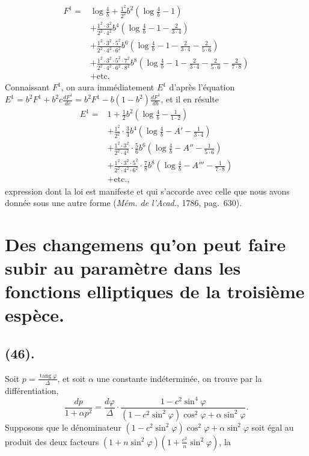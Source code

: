 \documentclass{article}
\begin{document}
\[ \begin{aligned} F^{1}={}&\log\frac{4}{b}+\frac{1^{2}}{2^{2}}b^{2}\left(\log\frac{4}{b}-1\right)\\ &+\frac{1^{2}\cdot 3^{2}}{2^{2}\cdot 4^{2}}b^{4}\left(\log\frac{4}{b}-1-\frac{2}{3\cdot 4}\right)\\ &+\frac{1^{2}\cdot 3^{2}\cdot 5^{2}}{2^{2}\cdot 4^{2}\cdot 6^{2}}b^{6}\left(\log\frac{4}{b}-1-\frac{2}{3\cdot 4}-\frac{2}{5\cdot 6}\right)\\ &+\frac{1^{2}\cdot 3^{2}\cdot 5^{2}\cdot 7^{2}}{2^{2}\cdot 4^{2}\cdot 6^{2}\cdot 8^{2}}b^{8}\left(\log\frac{4}{b}-1-\frac{2}{3\cdot 4}-\frac{2}{5\cdot 6}-\frac{2}{7\cdot 8}\right)\\ &+\text{etc.} \end{aligned} \]
Connaissant $F^{1}$, on aura immédiatement $E^{1}$ d'après l'équation $E^{1}=b^{2}F^{1}+b^{2}c\frac{dF^{1}}{dc}=b^{2}F^{1}-b(1-b^{2})\frac{dF^{1}}{db}$, et il en résulte
\[ \begin{aligned} E^{1}={}&1+\frac{1}{2}b^{2}\left(\log\frac{4}{b}-\frac{1}{1\cdot 2}\right)\\ &+\frac{1^{2}}{2^{2}}\cdot\frac{3}{4}b^{4}\left(\log\frac{4}{b}-A'-\frac{1}{3\cdot 4}\right)\\ &+\frac{1^{2}\cdot 3^{2}}{2^{2}\cdot 4^{2}}\cdot\frac{5}{6}b^{6}\left(\log\frac{4}{b}-A''-\frac{1}{5\cdot 6}\right)\\ &+\frac{1^{2}\cdot 3^{2}\cdot 5^{2}}{2^{2}\cdot 4^{2}\cdot 6^{2}}\cdot\frac{7}{8}b^{8}\left(\log\frac{4}{b}-A'''-\frac{1}{7\cdot 8}\right)\\ &+\text{etc.}, \end{aligned} \]
expression dont la loi est manifeste et qui s'accorde avec celle que nous avons donnée sous une autre forme (\emph{Mém. de l'Acad.}, 1786, pag.~630).

\section*{Des changemens qu'on peut faire subir au paramètre dans les fonctions elliptiques de la troisième espèce.}

\subsection*{(46).}

Soit $p=\frac{\operatorname{tang}\varphi}{\Delta}$, et soit $\alpha$ une constante indéterminée, on trouve par la différentiation,
\[ \frac{dp}{1+\alpha p^{2}}=\frac{d\varphi}{\Delta}\cdot\frac{1-c^{2}\sin^{4}\varphi}{(1-c^{2}\sin^{2}\varphi)\cos^{2}\varphi+\alpha\sin^{2}\varphi}. \]
Supposons que le dénominateur $(1-c^{2}\sin^{2}\varphi)\cos^{2}\varphi+\alpha\sin^{2}\varphi$ soit égal au produit des deux facteurs $(1+n\sin^{2}\varphi)\left(1+\frac{c^{2}}{n}\sin^{2}\varphi\right)$, la
\end{document}
